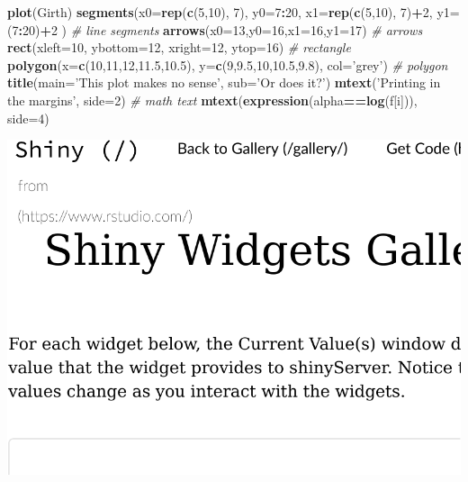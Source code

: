 \documentclass[]{book}
\newenvironment{Shaded}{\begin{snugshade}}{\end{snugshade}}
\newcommand{\KeywordTok}[1]{\textcolor[rgb]{0.13,0.29,0.53}{\textbf{#1}}}
\newcommand{\DataTypeTok}[1]{\textcolor[rgb]{0.13,0.29,0.53}{#1}}
\newcommand{\DecValTok}[1]{\textcolor[rgb]{0.00,0.00,0.81}{#1}}
\newcommand{\FloatTok}[1]{\textcolor[rgb]{0.00,0.00,0.81}{#1}}
\newcommand{\StringTok}[1]{\textcolor[rgb]{0.31,0.60,0.02}{#1}}
\newcommand{\CommentTok}[1]{\textcolor[rgb]{0.56,0.35,0.01}{\textit{#1}}}
\newcommand{\OperatorTok}[1]{\textcolor[rgb]{0.81,0.36,0.00}{\textbf{#1}}}
\newcommand{\NormalTok}[1]{#1}
\theoremstyle{definition}
\theoremstyle{definition}
\theoremstyle{definition}
\theoremstyle{remark}
\begin{document}
\begin{Shaded}
\begin{Highlighting}[]
\KeywordTok{plot}\NormalTok{(Girth)}
\KeywordTok{segments}\NormalTok{(}\DataTypeTok{x0=}\KeywordTok{rep}\NormalTok{(}\KeywordTok{c}\NormalTok{(}\DecValTok{5}\NormalTok{,}\DecValTok{10}\NormalTok{), }\DecValTok{7}\NormalTok{), }\DataTypeTok{y0=}\DecValTok{7}\OperatorTok{:}\DecValTok{20}\NormalTok{, }\DataTypeTok{x1=}\KeywordTok{rep}\NormalTok{(}\KeywordTok{c}\NormalTok{(}\DecValTok{5}\NormalTok{,}\DecValTok{10}\NormalTok{), }\DecValTok{7}\NormalTok{)}\OperatorTok{+}\DecValTok{2}\NormalTok{, }\DataTypeTok{y1=}\NormalTok{(}\DecValTok{7}\OperatorTok{:}\DecValTok{20}\NormalTok{)}\OperatorTok{+}\DecValTok{2}\NormalTok{ ) }\CommentTok{# line segments}
\KeywordTok{arrows}\NormalTok{(}\DataTypeTok{x0=}\DecValTok{13}\NormalTok{,}\DataTypeTok{y0=}\DecValTok{16}\NormalTok{,}\DataTypeTok{x1=}\DecValTok{16}\NormalTok{,}\DataTypeTok{y1=}\DecValTok{17}\NormalTok{) }\CommentTok{# arrows}
\KeywordTok{rect}\NormalTok{(}\DataTypeTok{xleft=}\DecValTok{10}\NormalTok{, }\DataTypeTok{ybottom=}\DecValTok{12}\NormalTok{,  }\DataTypeTok{xright=}\DecValTok{12}\NormalTok{, }\DataTypeTok{ytop=}\DecValTok{16}\NormalTok{) }\CommentTok{# rectangle}
\KeywordTok{polygon}\NormalTok{(}\DataTypeTok{x=}\KeywordTok{c}\NormalTok{(}\DecValTok{10}\NormalTok{,}\DecValTok{11}\NormalTok{,}\DecValTok{12}\NormalTok{,}\FloatTok{11.5}\NormalTok{,}\FloatTok{10.5}\NormalTok{), }\DataTypeTok{y=}\KeywordTok{c}\NormalTok{(}\DecValTok{9}\NormalTok{,}\FloatTok{9.5}\NormalTok{,}\DecValTok{10}\NormalTok{,}\FloatTok{10.5}\NormalTok{,}\FloatTok{9.8}\NormalTok{), }\DataTypeTok{col=}\StringTok{'grey'}\NormalTok{) }\CommentTok{# polygon}
\KeywordTok{title}\NormalTok{(}\DataTypeTok{main=}\StringTok{'This plot makes no sense'}\NormalTok{, }\DataTypeTok{sub=}\StringTok{'Or does it?'}\NormalTok{) }
\KeywordTok{mtext}\NormalTok{(}\StringTok{'Printing in the margins'}\NormalTok{, }\DataTypeTok{side=}\DecValTok{2}\NormalTok{) }\CommentTok{# math text}
\KeywordTok{mtext}\NormalTok{(}\KeywordTok{expression}\NormalTok{(alpha}\OperatorTok{==}\KeywordTok{log}\NormalTok{(f[i])), }\DataTypeTok{side=}\DecValTok{4}\NormalTok{)}
\end{Highlighting}
\end{Shaded}

\includegraphics[width=0.5\linewidth]{Rcourse_files/figure-latex/unnamed-chunk-268-1}
\end{document}
